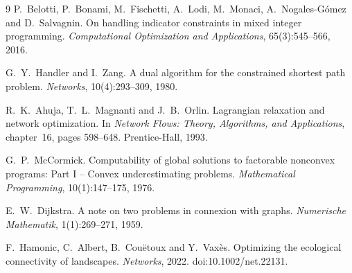 \documentclass[11pt,a4paper]{report}
\theoremstyle{definition}
\theoremstyle{remark}
\newcounter{optimization_program}
\newcounter{optimization_program_st}
\begin{document}
\begin{thebibliography}{9}
P.~Belotti, P.~Bonami, M.~Fischetti, A.~Lodi, M.~Monaci, A.~Nogales-G\'omez and D.~Salvagnin.
\newblock On handling indicator constraints in mixed integer programming.
\newblock \emph{Computational Optimization and Applications}, 65(3):545--566, 2016.

G.~Y.~Handler and I.~Zang.
\newblock A dual algorithm for the constrained shortest path problem.
\newblock \emph{Networks}, 10(4):293--309, 1980.

R.~K.~Ahuja, T.~L.~Magnanti and J.~B.~Orlin.
\newblock Lagrangian relaxation and network optimization.
\newblock In \emph{Network Flows: Theory, Algorithms, and Applications}, chapter~16, pages 598--648. Prentice-Hall, 1993.

G.~P.~McCormick.
\newblock Computability of global solutions to factorable nonconvex programs: Part {I} -- Convex underestimating problems.
\newblock \emph{Mathematical Programming}, 10(1):147--175, 1976.

E.~W.~Dijkstra.
\newblock A note on two problems in connexion with graphs.
\newblock \emph{Numerische Mathematik}, 1(1):269--271, 1959.

F.~Hamonic, C.~Albert, B.~Cou\"etoux and Y.~Vax\`es.
\newblock Optimizing the ecological connectivity of landscapes.
\newblock \emph{Networks}, 2022.
\newblock doi:10.1002/net.22131.
\end{thebibliography}
\end{document}
